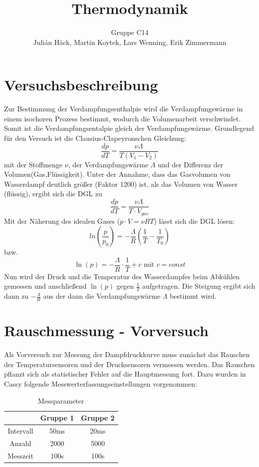 \documentclass[12pt,a4paper]{article}
\author{Gruppe C14 \\ Julián Häck, Martin Koytek, Lars Wenning, Erik Zimmermann}
\title{Thermodynamik}
\begin{document}
\maketitle
\newpage
\tableofcontents
\newpage
\section{Versuchsbeschreibung}
Zur Bestimmung der Verdampfungsenthalpie wird die Verdampfungswärme in einem isochoren Prozess bestimmt, wodurch die Volumenarbeit verschwindet. Somit ist die Verdampfungsentalpie gleich der Verdampfungswärme. Grundlegend für den Versuch ist die Clausius-Clapeyronschen Gleichung:
\begin{equation}
\frac{dp}{dT}=\frac{\nu \Lambda}{T(V_1-V_2)}
\end{equation}
mit der Stoffmenge $\nu$, der Verdampfungswärme $\Lambda$ und der Differenz der Volumen(Gas,Flüssigkeit).
Unter der Annahme, dass das Gasvolumen von Wasserdampf deutlich größer (Faktor 1200) ist, als das Volumen von Wasser (flüssig), ergibt sich die DGL zu
\begin{equation*}
\frac{dp}{dT}=\frac{\nu \Lambda}{T\cdot V_{gas}}
\end{equation*}
Mit der Näherung des idealen Gases ($p\cdot V=\nu R T$) lässt sich die DGL lösen:
\begin{equation}
ln(\frac{p}{p_0})=-\frac{\Lambda}{R}(\frac{1}{T}-\frac{1}{T_0})
\end{equation}
bzw.
\begin{equation}
\ln(p)=-\frac{\Lambda}{R}\cdot \frac{1}{T}+c \text{ mit } c=const
\end{equation}
Nun wird der Druck und die Temperatur des Wasserdampfes beim Abkühlen gemessen und anschließend $\ln(p)$ gegen $\frac{1}{T}$ aufgetragen. Die Steigung ergibt sich dann zu $-\frac{\Lambda}{R}$ aus der dann die Verdampfungswärme $\Lambda$ bestimmt wird.
\newpage
\section{Rauschmessung - Vorversuch}
Als Vorversuch  zur Messung der Dampfdruckkurve muss zunächst das Rauschen der Temperatursensoren und der Drucksensoren vermessen werden. Das Rauschen pflanzt sich als statistischer Fehler auf die Hauptmessung fort.
Dazu wurden in Cassy folgende Messwerterfassungseinstellungen vorgenommen:
\begin{table}[H]\centering
\caption{Messparameter}
\begin{tabular}{c|cc}
 & Gruppe 1 & Gruppe 2 \\ 
 \hline
Intervall & 50ms & 20ms \\ 
Anzahl & 2000 & 5000 \\ 
Messzeit & 100s & 100s \\ 
\end{tabular} 
\end{table}
\end{document}

